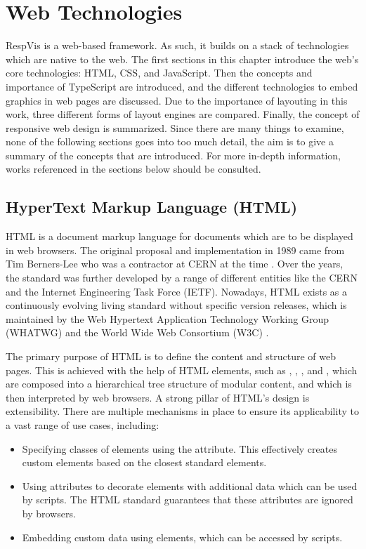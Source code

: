 
\chapter{Web Technologies}
\label{chap:WebTechnologies}

RespVis is a web-based framework. As such, it builds on a stack of
technologies which are native to the web. The first sections in this
chapter introduce the web's core technologies: HTML, CSS, and
JavaScript. Then the concepts and importance of TypeScript are
introduced, and the different technologies to embed graphics in web
pages are discussed. Due to the importance of layouting in this work,
three different forms of layout engines are compared. Finally, the
concept of responsive web design is summarized. Since there are many
things to examine, none of the following sections goes into too much
detail, the aim is to give a summary of the concepts that are
introduced. For more in-depth information, works referenced in the
sections below should be consulted.


\section{HyperText Markup Language (HTML)}
\label{sec:HTML}

HTML is a document markup language for documents which are to be
displayed in web browsers. The original proposal and implementation in
1989 came from Tim Berners-Lee who was a contractor at CERN at the
time \parencite{TBLProposal}. Over the years, the standard was further
developed by a range of different entities like the CERN and the
Internet Engineering Task Force (IETF). Nowadays, HTML exists as a
continuously evolving living standard without specific version
releases, which is maintained by the Web Hypertext Application
Technology Working Group (WHATWG) and the World Wide Web Consortium
(W3C) \parencite{HTML}.

The primary purpose of HTML is to define the content and structure of
web pages. This is achieved with the help of HTML elements, such as
, , , and ,
which are composed into a hierarchical tree structure of modular
content, and which is then interpreted by web browsers. A strong
pillar of HTML's design is extensibility. There are multiple
mechanisms in place to ensure its applicability to a vast range of use
cases, including:
\begin{itemize}
\item Specifying classes of elements using the 
  attribute. This effectively creates custom elements based on the
  closest standard elements.

\item Using  attributes to decorate elements with
  additional data which can be used by scripts. The HTML standard
  guarantees that these attributes are ignored by browsers.

\item Embedding custom data using  elements,
  which can be accessed by scripts.
\end{itemize}





